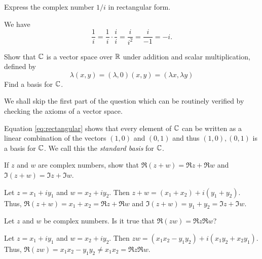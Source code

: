 \begin{example}
    Express the complex number \(1/i\) in rectangular form.

    \begin{solution}
        We have
        \[
            \frac{1}{i} = \frac{1}{i} \cdot \frac{i}{i} = \frac{i}{i^2} = \frac{i}{-1} = -i.
        \]
    \end{solution}
\end{example}

\begin{example}
    Show that \(\mathbb{C}\) is a vector space over \(\mathbb{R}\) under addition and scalar multiplication, defined by
    \[
        \lambda(x, y) = (\lambda, 0)(x, y) = (\lambda x, \lambda y)
    \]
    Find a basis for \(\mathbb{C}\).

    \begin{solution}
        We shall skip the first part of the question which can be routinely verified by checking the axioms of a vector space.

        Equation \eqref{eq:rectangular} shows that every element of \(\mathbb{C}\) can be written as a linear combination of the vectors \((1, 0)\) and \((0, 1)\) and thus \({(1, 0), (0, 1)}\) is a basis for \(\mathbb{C}\). We call this the \emph{standard basis} for \(\mathbb{C}\).
    \end{solution}
\end{example}

\begin{example}
    If \(z\) and \(w\) are complex numbers, show that \(\Re(z + w) = \Re z + \Re w\) and \(\Im(z + w) = \Im z + \Im w\).\label{ex:reimsum}

    \begin{solution}
        Let \(z = x_1 + iy_1\) and \(w = x_2 + iy_2\). Then \(z + w = (x_1 + x_2) + i(y_1 + y_2)\). Thus, \(\Re(z + w) = x_1 + x_2 = \Re z + \Re w\) 
        and \(\Im(z + w) = y_1 + y_2 = \Im z + \Im w\).
    \end{solution}
\end{example}

\begin{example}
    Let \(z\) and \(w\) be complex numbers. Is it true that \(\Re(zw) = \Re z \Re w\)?

    \begin{solution}
        Let \(z = x_1 + iy_1\) and \(w = x_2 + iy_2\). Then \(zw = (x_1x_2 - y_1y_2) + i(x_1y_2 + x_2y_1)\). Thus, \(\Re(zw) = x_1x_2 - y_1y_2 \neq x_1x_2 = \Re z \Re w\).
    \end{solution}
\end{example}


